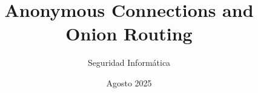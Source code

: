 \documentclass{beamer}
\title[Onion Routing] %
{Anonymous Connections and Onion Routing}
\subtitle{
}
\author[] %
{
    Seguridad Informática 
}
\institute[LCC - FCEIA] %
{
    Facultad de Ciencias Exactas, Ingeniería y Agrimensura\\Universidad Nacional de Rosario
}
\date[Seguridad Informática] %
{Agosto 2025}
\begin{document}
\frame{
    \titlepage
}

\begin{frame}
    \frametitle{}
\end{frame}

\begin{frame}
    \frametitle{}
\end{frame}

\begin{frame}
    \frametitle{}
\end{frame}

\begin{frame}
    \frametitle{}
\end{frame}

\begin{frame}
    \frametitle{}
\end{frame}

\begin{frame}
    \frametitle{}
\end{frame}

\begin{frame}
    \frametitle{}
\end{frame}

\begin{frame}
    \frametitle{}
\end{frame}

\begin{frame}
    \frametitle{}
\end{frame}

\begin{frame}
    \frametitle{}
\end{frame}

\begin{frame}
    \frametitle{}
\end{frame}
\end{document}
